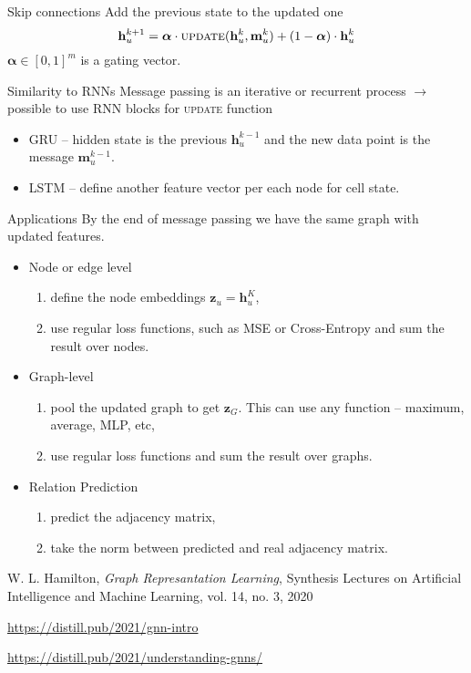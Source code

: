 \documentclass{beamer}
\begin{document}
\begin{frame}{Skip connections}
    Add the previous state to the updated one
    \begin{equation*}
        \mathbf{h}_u^{k+1} = \bm{\alpha}\cdot \textsc{update}(\mathbf{h}_u^k, \mathbf{m}_u^k) + (1-\bm{\alpha}) \cdot \mathbf{h}_u^k
    \end{equation*}
    $\bm{\alpha} \in [0, 1]^m$ is a gating vector.
\end{frame}

\begin{frame}{Similarity to RNNs}
    Message passing is an iterative or recurrent process $\rightarrow$ possible to use RNN blocks for \textsc{update} function
    \begin{itemize}
        \item GRU -- hidden state is the previous $\mathbf{h}_u^{k-1}$ and the new data point is the message $\mathbf{m}_u^{k-1}$.
        \item LSTM -- define another feature vector per each node for cell state.
    \end{itemize}
\end{frame}

\begin{frame}{Applications}
    By the end of message passing we have the same graph with updated features.

    \begin{itemize}
        \item Node or edge level
        \begin{enumerate}
            \item define the node embeddings $\mathbf{z}_u = \mathbf{h}_u^K$,
            \item use regular loss functions, such as MSE or Cross-Entropy and sum the result over nodes.
        \end{enumerate}
        \item Graph-level
        \begin{enumerate}
            \item pool the updated graph to get $\mathbf{z}_G$. This can use any function -- maximum, average, MLP, etc,
            \item use regular loss functions and sum the result over graphs.
        \end{enumerate}
        \item Relation Prediction
        \begin{enumerate}
            \item predict the adjacency matrix,
            \item take the norm between predicted and real adjacency matrix.
        \end{enumerate}
    \end{itemize}
\end{frame}

\begin{frame}
    W. L. Hamilton, \textit{Graph Represantation Learning}, Synthesis Lectures on Artificial Intelligence and Machine Learning, vol. 14, no. 3, 2020

    \url{https://distill.pub/2021/gnn-intro}

    \url{https://distill.pub/2021/understanding-gnns/}
\end{frame}
\end{document}
